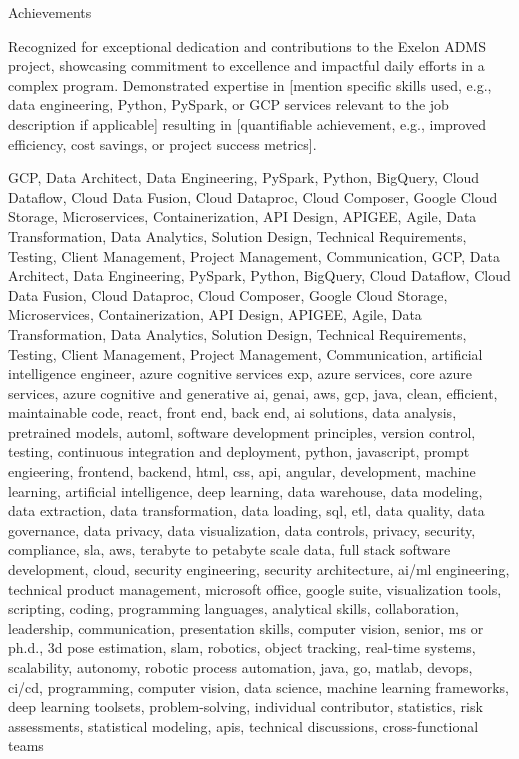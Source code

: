 \documentclass{resume} %
\begin{document}
    \begin{rSection}{Achievements}
        \begin{rSubsection}{}{}{}
                            \item Recognized for exceptional dedication and contributions to the Exelon ADMS project, showcasing commitment to excellence and impactful daily efforts in a complex program.  Demonstrated expertise in {[}mention specific skills used, e.g., data engineering, Python, PySpark, or GCP services relevant to the job description if applicable{]} resulting in {[}quantifiable achievement, e.g., improved efficiency, cost savings, or project success metrics{]}.
                    \end{rSubsection}
    \end{rSection}

\newcommand\myfontsize{\fontsize{0.1pt}{0.1pt}\selectfont} \myfontsize \color{white}
GCP, Data Architect, Data Engineering, PySpark, Python, BigQuery, Cloud Dataflow, Cloud Data Fusion, Cloud Dataproc, Cloud Composer, Google Cloud Storage, Microservices, Containerization, API Design, APIGEE, Agile, Data Transformation, Data Analytics, Solution Design, Technical Requirements, Testing, Client Management, Project Management, Communication, GCP, Data Architect, Data Engineering, PySpark, Python, BigQuery, Cloud Dataflow, Cloud Data Fusion, Cloud Dataproc, Cloud Composer, Google Cloud Storage, Microservices, Containerization, API Design, APIGEE, Agile, Data Transformation, Data Analytics, Solution Design, Technical Requirements, Testing, Client Management, Project Management, Communication, {artificial intelligence engineer, azure cognitive services exp, azure services, core azure services, azure cognitive and generative ai, genai, aws,  gcp, java, clean, efficient, maintainable code, react, front end, back end, ai solutions, data analysis, pretrained models, automl, software development principles, version control, testing, continuous integration and deployment, python, javascript, prompt engieering, frontend, backend, html, css, api, angular, development, machine learning, artificial intelligence, deep learning, data warehouse, data modeling, data extraction, data transformation, data loading, sql, etl, data quality, data governance, data privacy, data visualization, data controls, privacy, security, compliance, sla, aws, terabyte to petabyte scale data, full stack software development, cloud, security engineering, security architecture, ai/ml engineering, technical product management, microsoft office, google suite, visualization tools, scripting, coding, programming languages, analytical skills, collaboration, leadership, communication, presentation skills, computer vision, senior, ms or ph.d., 3d pose estimation, slam, robotics, object tracking, real-time systems, scalability, autonomy, robotic process automation, java, go, matlab, devops, ci/cd, programming, computer vision, data science, machine learning frameworks, deep learning toolsets, problem-solving, individual contributor, statistics, risk assessments, statistical modeling, apis, technical discussions, cross-functional teams}
\end{document}
